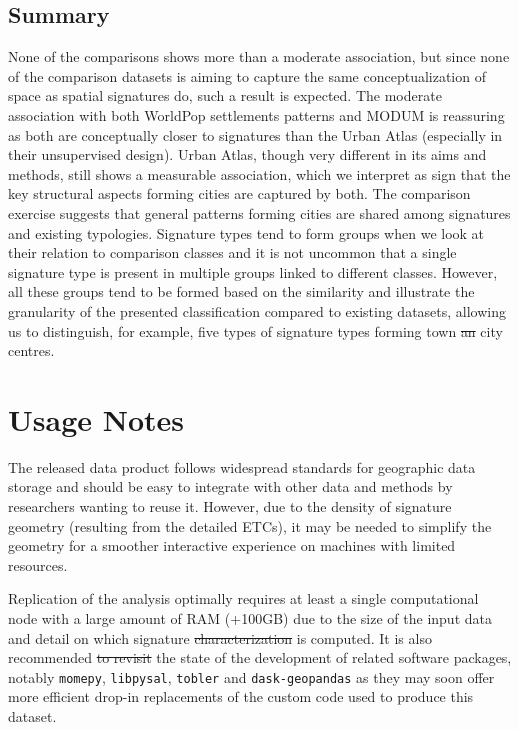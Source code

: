\documentclass[fleqn,10pt]{wlscirep}
\providecommand{\DIFadd}[1]{{\protect\color{blue}\uwave{#1}}} %
\providecommand{\DIFdel}[1]{{\protect\color{red}\sout{#1}}}                      %
\providecommand{\DIFaddbegin}{} %
\providecommand{\DIFaddend}{} %
\providecommand{\DIFdelbegin}{} %
\providecommand{\DIFdelend}{} %
\begin{document}
\subsection*{Summary}
None of the comparisons shows more than a moderate association, but since none of the
comparison datasets is aiming to capture the same conceptualization of space as spatial
signatures do, such a result is expected. The moderate association with both WorldPop
settlements patterns and MODUM is reassuring as both are conceptually closer to
signatures than the Urban Atlas (especially in their unsupervised design). Urban Atlas,
though very different in its aims and methods, still shows a measurable association,
which we interpret as sign that the key structural aspects forming cities are captured by both. The
comparison exercise suggests that general patterns forming cities are shared among
signatures and existing typologies. Signature types tend to form groups when we look at
their relation to comparison classes and it is not uncommon that a single signature type
is present in multiple groups linked to different classes. However, all these groups
tend to be formed based on the similarity and illustrate the granularity of the
presented classification compared to existing datasets, allowing us to distinguish, for
example, five types of signature types forming town \DIFdelbegin \DIFdel{an }\DIFdelend \DIFaddbegin \DIFadd{and }\DIFaddend city centres.


\section*{Usage Notes}

The released data product follows widespread standards for geographic data storage and
should be easy to integrate with other data and methods by researchers wanting to reuse it. However, due to the density of
signature geometry (resulting from the detailed ETCs), it may be needed to simplify the
geometry for a smoother interactive experience on machines with limited resources.

Replication of the analysis optimally requires at least a single computational node with
a large amount of RAM (+100GB) due to the size of the input data and detail on which
signature \DIFdelbegin \DIFdel{characterization }\DIFdelend \DIFaddbegin \DIFadd{characterisation }\DIFaddend is computed. It is also recommended \DIFdelbegin \DIFdel{to revisit }\DIFdelend \DIFaddbegin \DIFadd{revisiting }\DIFaddend the state of
the development of related software packages, notably
\texttt{momepy}\cite{fleischmann_2019}, \texttt{libpysal}\cite{rey2021pysal},
\texttt{tobler}\cite{eli_knaap_2021_5047613} and
\texttt{dask-geopandas} as they may soon offer more efficient drop-in replacements
of the custom code used to produce this dataset.
\end{document}
